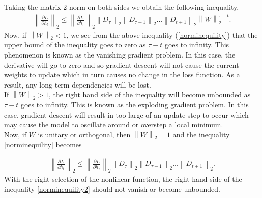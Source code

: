 \documentclass[letterpaper]{article} %
\begin{document}
\noindent Taking the matrix 2-norm on both sides we obtain the following inequality,
\begin{gather}
\label{norminequility}
\left\lVert \frac{\partial L}{\partial h_t}\right\rVert_2 \leq \left\lVert \frac{\partial L}{\partial h_{\tau}} \right\rVert_2 \left\lVert D_{\tau} \right\rVert_2 \left\lVert D_{\tau-1} \right\rVert_2 ... \left\lVert D_{t+1} \right\rVert_2 \left\lVert W \right\rVert^{\tau - t}_2.
\end{gather}
\noindent Now, if $\left\lVert W \right\rVert_2 < 1$, we see from the above inequality (\ref{norminequility}) that the upper bound of the inequality goes to zero as $\tau - t$ goes to infinity.  This phenomenon is known as the vanishing gradient problem.  In this case, the derivative will go to zero and so gradient descent will not cause the current weights to update which in turn causes no change in the loss function.  As a result, any long-term dependencies will be lost.\\
\noindent If $\left\lVert W \right\rVert_2 > 1$, the right hand side of the inequality will become unbounded as $\tau - t$ goes to infinity. This is known as the exploding gradient problem.  In this case, gradient descent will result in too large of an update step to occur which may cause the model to oscillate around or overstep a local minimum.\\

\noindent Now, if $W$ is unitary or orthogonal, then $\left\lVert W \right\rVert_2 = 1$ and the inequality \ref{norminequility} becomes

\begin{gather}
\label{norminequility2}
\left\lVert \frac{\partial L}{\partial h_t}\right\rVert_2 \leq \left\lVert \frac{\partial L}{\partial h_{\tau}} \right\rVert_2 \left\lVert D_{\tau} \right\rVert_2 \left\lVert D_{\tau-1} \right\rVert_2 ... \left\lVert D_{t+1} \right\rVert_2 .
\end{gather}
\noindent With the right selection of the nonlinear function, the right hand side of the inequality \ref{norminequility2} should not vanish or become unbounded.\\
\end{document}
